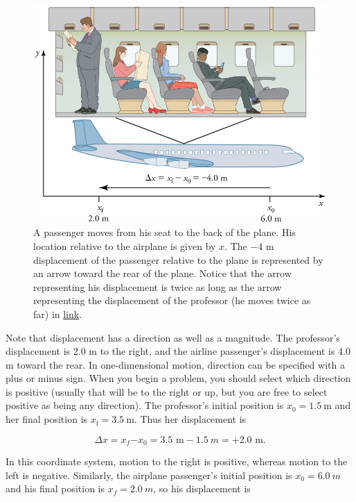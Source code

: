 \documentclass[
]{book}
\begin{document}
\begin{figure}
\hypertarget{import-auto-id2707699}{%
\centering
\includegraphics{images/Figure 02_01_02.jpg}
\caption{A passenger moves from his seat to the back of the plane. His location
relative to the airplane is given by \(x{}\). The −4 m displacement of the
passenger relative to the plane is represented by an arrow toward the
rear of the plane. Notice that the arrow representing his displacement
is twice as long as the arrow representing the displacement of the
professor (he moves twice as far) in
\protect\hyperlink{import-auto-id2972079}{link}.}\label{import-auto-id2707699}
}
\end{figure}

Note that displacement has a direction as well as a magnitude. The
professor's displacement is 2.0 m to the right, and the airline
passenger's displacement is 4.0 m toward the rear. In one-dimensional
motion, direction can be specified with a plus or minus sign. When you
begin a problem, you should select which direction is positive (usually
that will be to the right or up, but you are free to select positive as
being any direction). The professor's initial position is
\({{x_{0} = 1}\text{.}5\ \text{m}}{}\) and her final position is
\({{x_{\text{f}} = 3}\text{.}5\ \text{m}}{}\). Thus her displacement is

\leavevmode{}%
\[{{{\Delta x = x_{f}{- x_{0}} = 3}\text{.5\ m} - 1.5\ m = + 2\text{.0\ m}}.}{}\]

In this coordinate system, motion to the right is positive, whereas
motion to the left is negative. Similarly, the airplane passenger's
initial position is \({x_{0} = 6}\text{.}0\ m\) and his final position is
\({{x_{f} = 2}\text{.}0\ m}{}\), so his displacement is
\end{document}
